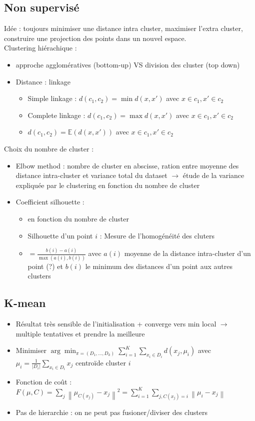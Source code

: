 \documentclass{article}
\begin{document}
\begin{multicols}{2}
\section{Non supervisé}
Idée : toujours minimiser une distance intra cluster, maximiser l'extra cluster, construire une projection des points dans un nouvel espace. \\
Clustering hiérachique : 
\begin{itemize}
    \item approche agglomératives (bottom-up) VS division des cluster (top down)
    \item Distance : linkage \begin{itemize}
        \item Simple linkage : $ d(c_1, c_2) = \min d(x, x') $ avec $ x \in c_1, x' \in c_2 $ 
        \item Complete linkage : $ d(c_1, c_2) = \max d(x, x') $ avec $ x \in c_1, x' \in c_2 $ 
        \item $ d(c_1, c_2) = \mathbb{E}(d(x, x')) $ avec $ x \in c_1, x' \in c_2 $ 
    \end{itemize}
\end{itemize}
Choix du nombre de cluster : 
\begin{itemize}
    \item Elbow method : nombre de cluster en abscisse, ration entre moyenne des distance intra-cluster et variance total du dataset $\rightarrow$ étude de la variance expliquée par le clustering en fonction du nombre de cluster 
    \item Coefficient silhouette : \begin{itemize}
        \item en fonction du nombre de cluster
        \item Silhouette d'un point $ i $ : Mesure de l'homogénéité des cluters
        \item $ = \frac{b(i) - a(i)}{ \max (a(i), b(i))} $ avec $ a(i) $ moyenne de la distance intra-cluster d'un point (?) et $ b(i) $ le minimum des distances d'un point aux autres clusters
    \end{itemize}
\end{itemize}

\subsection{K-mean}
\begin{itemize}
    \item Résultat très sensible de l'initialisation + converge vers min local $\rightarrow$ multiple tentatives et prendre la meilleure
    \item Minimiser $ \arg \min _{\pi = (D_1, \dots, D_k)} \sum_{i=1}^{K} \sum_{x_i \in D_i}^{} d(x_j, \mu _i)$ avec $ \mu _i = \frac{1}{\left| D_i \right| } \sum_{x_i \in D_i} x_j$ centroïde cluster $ i $ 
    \item Fonction de coût : $ F(\mu , C) = \sum_{j}^{} \left\| \mu _{C(x_j)} - x_j \right\|^2 = \sum_{i=1}^{K} \sum_{j, C(x_j) = i} \left\| \mu _i - x_j \right\| $ 
    \item Pas de hierarchie : on ne peut pas fusioner/diviser des clusters
\end{itemize}


\end{multicols}
\end{document}
